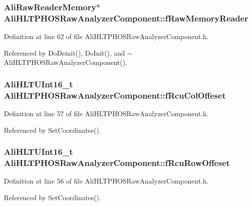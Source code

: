 \subsubsection{\setlength{\rightskip}{0pt plus 5cm}Ali\-Raw\-Reader\-Memory$\ast$ {\bf Ali\-HLTPHOSRaw\-Analyzer\-Component::f\-Raw\-Memory\-Reader}\hspace{0.3cm}{\tt  [private]}}\label{classAliHLTPHOSRawAnalyzerComponent_AliHLTPHOSRawAnalyzerComponentr9}




Definition at line 62 of file Ali\-HLTPHOSRaw\-Analyzer\-Component.h.

Referenced by Do\-Deinit(), Do\-Init(), and $\sim$Ali\-HLTPHOSRaw\-Analyzer\-Component().
\subsubsection{\setlength{\rightskip}{0pt plus 5cm}Ali\-HLTUInt16\_\-t {\bf Ali\-HLTPHOSRaw\-Analyzer\-Component::f\-Rcu\-Col\-Offeset}\hspace{0.3cm}{\tt  [private]}}\label{classAliHLTPHOSRawAnalyzerComponent_AliHLTPHOSRawAnalyzerComponentr4}




Definition at line 57 of file Ali\-HLTPHOSRaw\-Analyzer\-Component.h.

Referenced by Set\-Coordinates().
\subsubsection{\setlength{\rightskip}{0pt plus 5cm}Ali\-HLTUInt16\_\-t {\bf Ali\-HLTPHOSRaw\-Analyzer\-Component::f\-Rcu\-Row\-Offeset}\hspace{0.3cm}{\tt  [private]}}\label{classAliHLTPHOSRawAnalyzerComponent_AliHLTPHOSRawAnalyzerComponentr3}




Definition at line 56 of file Ali\-HLTPHOSRaw\-Analyzer\-Component.h.

Referenced by Set\-Coordinates().
